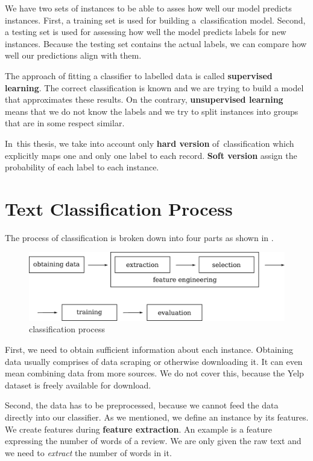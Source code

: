 We have two sets of instances to be able to asses how well our model predicts instances.
First, a training set is  used for building a~classification model.
Second, a testing set is used for assessing how well the model predicts labels for new instances.
Because the testing set contains the actual labels, we can compare how well our predictions align with them.

The approach of fitting a classifier to labelled data is called \textbf{supervised learning}.
The correct classification is known and we are trying to build a model that approximates these results.
On the contrary, \textbf{unsupervised learning} means that we do not know the labels and we try to split instances into groups that are in some respect similar.

In~this thesis, we take into account only \textbf{hard version} of~classification which explicitly maps one and only one label to each record.  
\textbf{Soft version} assign the probability of each label to each instance.

\section{Text Classification Process}


The process of classification is broken down into four parts as shown in .

\begin{figure}[h]
	\centering
	\includegraphics[width=12cm]{figures/clsf_process.eps}
	\caption{classification process}\label{fig:clsf_process}
\end{figure}

First, we need to obtain sufficient information about each instance.
Obtaining data usually comprises of data scraping or otherwise downloading it.
It can even mean combining data from more sources.
We do not cover this, because the Yelp dataset is freely available for download.

Second, the data has to be preprocessed, because we cannot feed the data directly into our classifier.
As we mentioned, we define an instance by its features.
We create features during \textbf{feature extraction}.
An example is a feature expressing the number of words of a review.
We are only given the raw text and we need to \textit{extract} the number of words in it.

